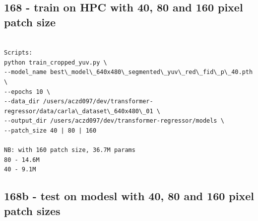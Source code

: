 \subsection{168 - train on HPC with 40, 80 and 160 pixel patch size}
\label{app_res:168}
\begin{verbatim}

Scripts:
python train_cropped_yuv.py \
--model_name best\_model\_640x480\_segmented\_yuv\_red\_fid\_p\_40.pth \
--epochs 10 \
--data_dir /users/aczd097/dev/transformer-regressor/data/carla\_dataset\_640x480\_01 \
--output_dir /users/aczd097/dev/transformer-regressor/models \
--patch_size 40 | 80 | 160

NB: with 160 patch size, 36.7M params
80 - 14.6M
40 - 9.1M
\end{verbatim}

\subsection{168b - test on modesl with 40, 80 and 160 pixel patch sizes}
\label{app_res:168b}

